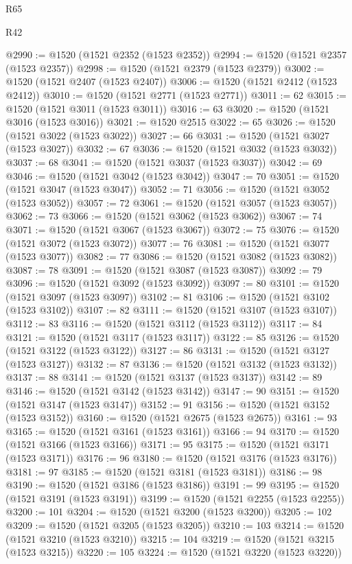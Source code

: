 \begin{lexlean}{R65}
\begin{lexlean}{R42}
\begin{coremodule}
{{{{{{{{{{{{{{{{{{{{{{{{{{{{{{{{{{{{{{{{{{{{{{{{{{{{{{{{{{{{{{{{{{{{{{{{{{{{{{{{{{{{{{{{{{{{{{{{{{{{{{{{{{{{{{{{{{{{{{{{{{{{{{{{{{{{{{{{{{{{{{{{{{{{{{{{{{{{{{{{{{{{{{{{{{{{{{{{{{{{{{{{@2990 := @1520 (@1521 @2352 (@1523 @2352))
@2994 := @1520 (@1521 @2357 (@1523 @2357))
@2998 := @1520 (@1521 @2379 (@1523 @2379))
@3002 := @1520 (@1521 @2407 (@1523 @2407))
@3006 := @1520 (@1521 @2412 (@1523 @2412))
@3010 := @1520 (@1521 @2771 (@1523 @2771))
@3011 := 62
@3015 := @1520 (@1521 @3011 (@1523 @3011))
@3016 := 63
@3020 := @1520 (@1521 @3016 (@1523 @3016))
@3021 := @1520 @2515
@3022 := 65
@3026 := @1520 (@1521 @3022 (@1523 @3022))
@3027 := 66
@3031 := @1520 (@1521 @3027 (@1523 @3027))
@3032 := 67
@3036 := @1520 (@1521 @3032 (@1523 @3032))
@3037 := 68
@3041 := @1520 (@1521 @3037 (@1523 @3037))
@3042 := 69
@3046 := @1520 (@1521 @3042 (@1523 @3042))
@3047 := 70
@3051 := @1520 (@1521 @3047 (@1523 @3047))
@3052 := 71
@3056 := @1520 (@1521 @3052 (@1523 @3052))
@3057 := 72
@3061 := @1520 (@1521 @3057 (@1523 @3057))
@3062 := 73
@3066 := @1520 (@1521 @3062 (@1523 @3062))
@3067 := 74
@3071 := @1520 (@1521 @3067 (@1523 @3067))
@3072 := 75
@3076 := @1520 (@1521 @3072 (@1523 @3072))
@3077 := 76
@3081 := @1520 (@1521 @3077 (@1523 @3077))
@3082 := 77
@3086 := @1520 (@1521 @3082 (@1523 @3082))
@3087 := 78
@3091 := @1520 (@1521 @3087 (@1523 @3087))
@3092 := 79
@3096 := @1520 (@1521 @3092 (@1523 @3092))
@3097 := 80
@3101 := @1520 (@1521 @3097 (@1523 @3097))
@3102 := 81
@3106 := @1520 (@1521 @3102 (@1523 @3102))
@3107 := 82
@3111 := @1520 (@1521 @3107 (@1523 @3107))
@3112 := 83
@3116 := @1520 (@1521 @3112 (@1523 @3112))
@3117 := 84
@3121 := @1520 (@1521 @3117 (@1523 @3117))
@3122 := 85
@3126 := @1520 (@1521 @3122 (@1523 @3122))
@3127 := 86
@3131 := @1520 (@1521 @3127 (@1523 @3127))
@3132 := 87
@3136 := @1520 (@1521 @3132 (@1523 @3132))
@3137 := 88
@3141 := @1520 (@1521 @3137 (@1523 @3137))
@3142 := 89
@3146 := @1520 (@1521 @3142 (@1523 @3142))
@3147 := 90
@3151 := @1520 (@1521 @3147 (@1523 @3147))
@3152 := 91
@3156 := @1520 (@1521 @3152 (@1523 @3152))
@3160 := @1520 (@1521 @2675 (@1523 @2675))
@3161 := 93
@3165 := @1520 (@1521 @3161 (@1523 @3161))
@3166 := 94
@3170 := @1520 (@1521 @3166 (@1523 @3166))
@3171 := 95
@3175 := @1520 (@1521 @3171 (@1523 @3171))
@3176 := 96
@3180 := @1520 (@1521 @3176 (@1523 @3176))
@3181 := 97
@3185 := @1520 (@1521 @3181 (@1523 @3181))
@3186 := 98
@3190 := @1520 (@1521 @3186 (@1523 @3186))
@3191 := 99
@3195 := @1520 (@1521 @3191 (@1523 @3191))
@3199 := @1520 (@1521 @2255 (@1523 @2255))
@3200 := 101
@3204 := @1520 (@1521 @3200 (@1523 @3200))
@3205 := 102
@3209 := @1520 (@1521 @3205 (@1523 @3205))
@3210 := 103
@3214 := @1520 (@1521 @3210 (@1523 @3210))
@3215 := 104
@3219 := @1520 (@1521 @3215 (@1523 @3215))
@3220 := 105
@3224 := @1520 (@1521 @3220 (@1523 @3220))
}}}}}}}}}}}}}}}}}}}}}}}}}}}}}}}}}}}}}}}}}}}}}}}}}}}}}}}}}}}}}}}}}}}}}}}}}}}}}}}}}}}}}}}}}}}}}}}}}}}}}}}}}}}}}}}}}}}}}}}}}}}}}}}}}}}}}}}}}}}}}}}}}}}}}}}}}}}}}}}}}}}}}}}}}}}}}}}}}}}}}}}}
\end{coremodule}
\end{lexlean}
\end{lexlean}
